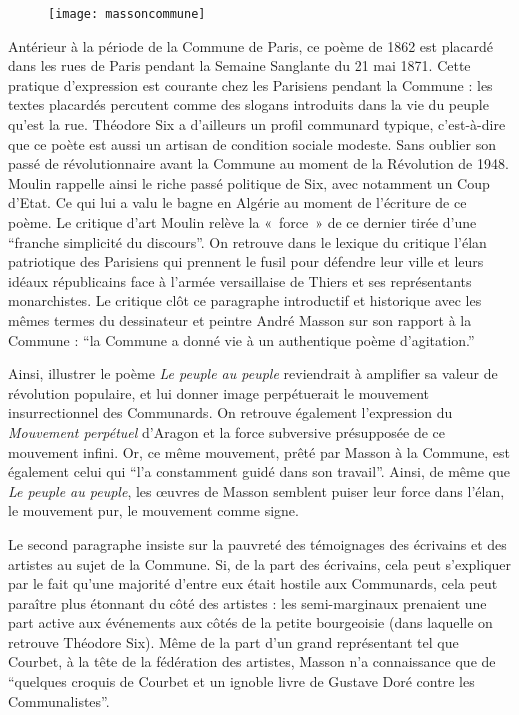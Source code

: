 \begin{figure}[H]
   \centering
   \texttt{[image: massoncommune]}
	\caption{\cite{commune}}\label{articlemoulin}
\end{figure}


 Antérieur à la période de la Commune de Paris, ce poème de 1862 est  placardé dans les rues de Paris pendant la Semaine Sanglante du 21 mai 1871. Cette pratique d'expression est courante chez les Parisiens pendant la Commune : les textes placardés percutent comme des slogans introduits dans la vie du peuple qu'est la rue. Théodore Six a d'ailleurs un profil communard typique, c'est-à-dire que ce poète est aussi un artisan de condition sociale modeste. Sans oublier son passé de révolutionnaire avant la Commune au moment de la Révolution de 1948.  Moulin rappelle ainsi le riche passé politique de Six, avec notamment un Coup d’Etat. Ce qui lui a valu le bagne en Algérie au moment de l'écriture de ce poème. Le critique d’art Moulin relève la « force » de ce dernier tirée d’une \enquote{franche simplicité du discours}. On retrouve dans le lexique du critique l’élan patriotique des Parisiens qui prennent le fusil pour défendre leur ville et leurs idéaux républicains face à l’armée versaillaise de Thiers et ses représentants monarchistes. Le critique clôt ce paragraphe introductif et historique avec les mêmes termes du dessinateur et peintre André Masson sur son rapport à la Commune : \enquote{la Commune a donné vie à un authentique poème d’agitation.}

	  Ainsi, illustrer le poème \emph{Le peuple au peuple} reviendrait à amplifier sa valeur de révolution populaire, et lui donner image perpétuerait le mouvement insurrectionnel des Communards. On retrouve également l'expression du \emph{Mouvement perpétuel} d’Aragon et la force subversive présupposée de ce mouvement infini. Or, ce même mouvement, prêté par Masson à la Commune, est également celui qui \enquote{l’a constamment guidé dans son travail}. Ainsi, de même que \emph{Le peuple au peuple}, les \oe{}uvres de Masson semblent puiser leur force dans l’élan, le mouvement pur, le mouvement comme signe. 

	Le second paragraphe insiste sur la pauvreté des témoignages des écrivains et des artistes au sujet de la Commune. Si, de la part des écrivains, cela peut s’expliquer par le fait qu’une majorité d’entre eux était hostile aux Communards, cela peut paraître plus étonnant du côté des artistes : les semi-marginaux prenaient une part active aux événements aux côtés de la petite bourgeoisie (dans laquelle on retrouve Théodore Six). Même de la part d’un grand représentant tel que Courbet, à la tête de la fédération des artistes, Masson n’a connaissance que de \enquote{quelques croquis de Courbet et un ignoble livre de Gustave Doré contre les Communalistes}. 


